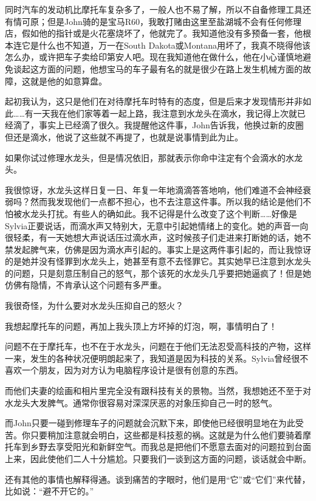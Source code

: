 \documentclass[UTF8]{article}
\begin{document}
\par 同时汽车的发动机比摩托车复杂多了，一般人也不易了解，所以不自备修理工具还有情可原；但是John骑的是宝马R60，我敢打赌由这里至盐湖城不会有任何修理店，假如他的指针或是火花塞烧坏了，他就完了。我知道他没有多预备一套，他根本连它是什么也不知道，万一在South Dakota或Montana用坏了，我真不晓得他该怎么办，或许把车子卖给印第安人吧。现在我知道他在做什么，他在小心谨慎地避免谈起这方面的问题，他想宝马的车子最有名的就是很少在路上发生机械方面的故障，这就是他的如意算盘。
\par 起初我认为，这只是他们在对待摩托车时特有的态度，但是后来才发现情形并非如此……有一天我在他们家等着一起上路，我注意到水龙头在滴水，我记得上次就已经滴了，事实上已经滴了很久。我提醒他这件事，John告诉我，他换过新的皮圈但还是滴水，他说了这些就不再提了，也就是说事情到此为止。
\par 如果你试过修理水龙头，但是情况依旧，那就表示你命中注定有个会滴水的水龙头。
\par 我很惊讶，水龙头这样日复一日、年复一年地滴滴答答地响，他们难道不会神经衰弱吗？然而我发现他们一点都不担心，也不去注意这件事。所以我的结论是他们不怕被水龙头打扰。有些人的确如此。我不记得是什么改变了这个判断……好像是Sylvia正要说话，而滴水声又特别大，无意中引起她情绪上的变化。她的声音一向很轻柔，有一天她想大声说话压过滴水声，这时候孩子们走进来打断她的话，她不禁发起脾气来，仿佛是因为滴水声引起的。事实上是这两件事引起的，而让我惊讶的是她并没有怪罪到水龙头上，她甚至有意不去怪罪它。其实她早已注意到水龙头的问题，只是刻意压制自己的怒气，那个该死的水龙头几乎要把她逼疯了！但是她仿佛有隐情，不肯承认这个问题有多严重。
\par 我很奇怪，为什么要对水龙头压抑自己的怒火？
\par 我想起摩托车的问题，再加上我头顶上方坏掉的灯泡，啊，事情明白了！
\par 问题不在于摩托车，也不在于水龙头，问题在于他们无法忍受高科技的产物，这样一来，发生的各种状况便明朗起来了，我知道是因为科技的关系。Sylvia曾经很不喜欢一个朋友，因为对方认为电脑程序设计是很有创意的东西。
\par 而他们夫妻的绘画和相片里完全没有跟科技有关的景物。当然，我想她还不至于对水龙头大发脾气。通常你很容易对深深厌恶的对象压抑自己一时的怒气。
\par 而John只要一碰到修理车子的问题就会沉默下来，即使他已经很明显地在为此受苦。你只要稍加注意就会明白，这些都是科技惹的祸。这就是为什么他们要骑着摩托车到乡野去享受阳光和新鲜空气。而我总是把他们不愿意去面对的问题拉到台面上来，因此使他们二人十分尴尬。只要我们一谈到这方面的问题，谈话就会中断。
\par 还有其他的事情也解释得通。谈到痛苦的字眼时，他们是用“它”或“它们”来代替，比如说：“避不开它的。”
\end{document}
